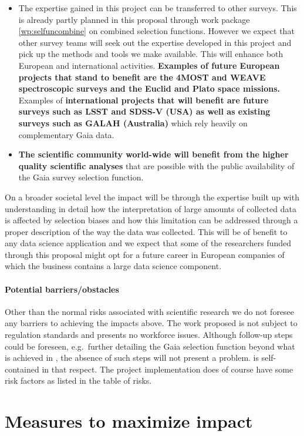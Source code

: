 \begin{itemize}
    \item The expertise gained in this project can be transferred to other surveys. This is already partly planned in this proposal through work package \ref{wp:selfuncombine} on combined selection functions. However we expect that other survey teams will seek out the expertise developed in this project and  pick up the methods and tools we make available. This will enhance both European and international activities. \textbf{Examples of future European projects that stand to benefit are the 4MOST and WEAVE spectroscopic surveys and the Euclid and Plato space missions.} Examples of \textbf{international projects that will benefit are future surveys such as LSST and SDSS-V (USA) as well as existing surveys such as GALAH (Australia)} which rely heavily on complementary Gaia data.
    \item \textbf{The scientific community world-wide will benefit from the higher quality scientific analyses} that are possible with the public availability of the Gaia survey selection function.
\end{itemize}

On a broader societal level the impact will be through the expertise built up with understanding in detail how the interpretation of large amounts of collected data is affected by selection biases and how this limitation can be addressed through a proper description of the way the data was collected. This will be of benefit to any data science application and we expect that some of the researchers funded through this proposal might opt for a future career in European companies of which the business contains a large data science component.

\paragraph{Potential barriers/obstacles} Other than the normal risks associated with scientific research we do not foresee any barriers to achieving the impacts above. The work proposed is not subject to regulation standards and presents no workforce issues. Although follow-up steps could be foreseen, e.g.\ further detailing the Gaia selection function beyond what is achieved in {\acro}, the absence of such steps will not present a problem. {\acro} is self-contained in that respect. The project implementation does of course have some risk factors as listed in the table of risks.

\section{Measures to maximize impact} 
\label{sec:maximize-impact}

